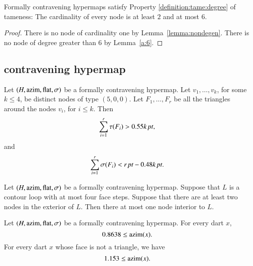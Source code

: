 \begin{lemma} 
Formally contravening hypermaps satisfy Property
\ref{definition:tame:degree} of tameness: The cardinality of every
node is at least $2$ and at most $6$.
\end{lemma}

\begin{proof}  There is no node of cardinality one by
Lemma~\ref{lemma:nondegen}.  There is no node of degree
greater than $6$ by Lemma~\ref{a:6}.
\end{proof}


\subsection{contravening hypermap}


\begin{lemma} \label{lemma:0.55:bis} %
Let $(H,{\operatorname{azim}},\operatorname{flat},\sigma)$ be a formally contravening hypermap.
Let $v_1,\ldots, v_k$, for some $k\le 4$, be distinct nodes of type
$(5,0,0)$.  Let $F_1,\ldots, F_r$ be all the triangles around the
nodes $v_i$, for $i\le k$. Then
    $$
    \sum_{i=1}^r \tau(F_i)> 0.55k\,\hbox{\it pt},
    $$
and
    $$\sum_{i=1}^r \sigma(F_i) < r\,\hbox{\it pt} - 0.48k\,\hbox{\it pt}.$$
\end{lemma}


\begin{lemma}\label{lemma:no-2}
Let $(H,{\operatorname{azim}},\operatorname{flat},\sigma)$ be a formally contravening hypermap.
Suppose that $L$ is a contour loop with at most four face steps.
Suppose that there are at least two nodes in the exterior of $L$.
Then there at most one node interior to $L$.
\end{lemma}


\begin{lemma} \label{lemma:0.8638}
Let $(H,{\operatorname{azim}},\operatorname{flat},\sigma)$ be a formally contravening
hypermap. For every dart $x$,
    $$0.8638\le {\operatorname{azim}}(x).$$
For every dart $x$ whose face is not a triangle, we have
    $$1.153\le{\operatorname{azim}}(x).$$
\end{lemma}

